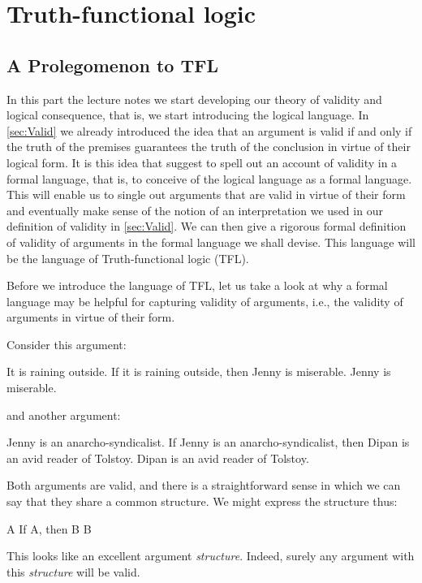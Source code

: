 \part{Truth-functional logic}
\label{ch:TFL}

\chapter{A Prolegomenon to TFL}
In this part the lecture notes we start developing our theory of validity and logical consequence, that is, we start introducing the logical language. In \cref{sec:Valid} we already introduced the idea that an argument is valid if and only if the truth of the premises guarantees the truth of the conclusion in virtue of their logical form. It is this idea that suggest to spell out an account of validity in a formal language, that is, to conceive of the logical language as a formal language. This will enable us to single out arguments that are valid in virtue of their form and eventually make sense of the notion of an interpretation we used in our definition of validity in \cref{sec:Valid}. We can then give a rigorous formal definition of validity of arguments in the formal language we shall devise. This language will be the language of Truth-functional logic (TFL).

Before we introduce the language of TFL, let us take a look at why a formal language may be helpful for capturing validity of arguments, i.e., the validity of arguments in virtue of their form.

Consider this argument:
	\begin{earg}
		\prem It is raining outside.
		\prem If it is raining outside, then Jenny is miserable.
		\conc Jenny is miserable.
	\end{earg}
and another argument:
	\begin{earg}
		\prem Jenny is an anarcho-syndicalist.
		\prem If Jenny is an anarcho-syndicalist, then Dipan is an avid reader of Tolstoy.
		\conc Dipan is an avid reader of Tolstoy.
	\end{earg}
Both arguments are valid, and there is a straightforward sense in which we can say that they share a common structure. We might express the structure thus:
	\begin{earg}
		\prem A
		\prem If A, then B
		\conc B
	\end{earg}
This looks like an excellent argument \emph{structure}. Indeed, surely any argument with this \emph{structure} will be valid.

